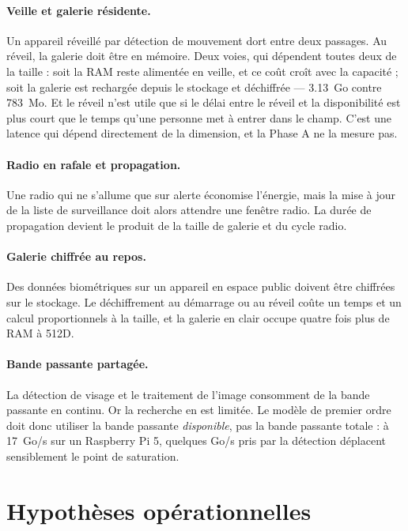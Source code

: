 \documentclass[11pt,a4paper]{article}
\begin{document}
\paragraph{Veille et galerie résidente.} Un appareil réveillé par détection de
mouvement dort entre deux passages. Au réveil, la galerie doit être en mémoire. Deux
voies, qui dépendent toutes deux de la taille : soit la RAM reste alimentée en veille,
et ce coût croît avec la capacité ; soit la galerie est rechargée depuis le stockage
et déchiffrée — \num{3,13}~Go contre 783~Mo. Et le réveil n'est utile que si le délai
entre le réveil et la disponibilité est plus court que le temps qu'une personne met à
entrer dans le champ. C'est une latence qui dépend directement de la dimension, et la
Phase A ne la mesure pas.

\paragraph{Radio en rafale et propagation.} Une radio qui ne s'allume que sur alerte
économise l'énergie, mais la mise à jour de la liste de surveillance doit alors
attendre une fenêtre radio. La durée de propagation devient le produit de la taille
de galerie et du cycle radio.

\paragraph{Galerie chiffrée au repos.} Des données biométriques sur un appareil en
espace public doivent être chiffrées sur le stockage. Le déchiffrement au démarrage
ou au réveil coûte un temps et un calcul proportionnels à la taille, et la galerie en
clair occupe quatre fois plus de RAM à 512D.

\paragraph{Bande passante partagée.} La détection de visage et le traitement de
l'image consomment de la bande passante en continu. Or la recherche en est limitée.
Le modèle de premier ordre doit donc utiliser la bande passante \emph{disponible},
pas la bande passante totale : à 17~Go/s sur un Raspberry Pi 5, quelques Go/s pris
par la détection déplacent sensiblement le point de saturation.

\section{Hypothèses opérationnelles}\label{sec:operationnel}
\end{document}
